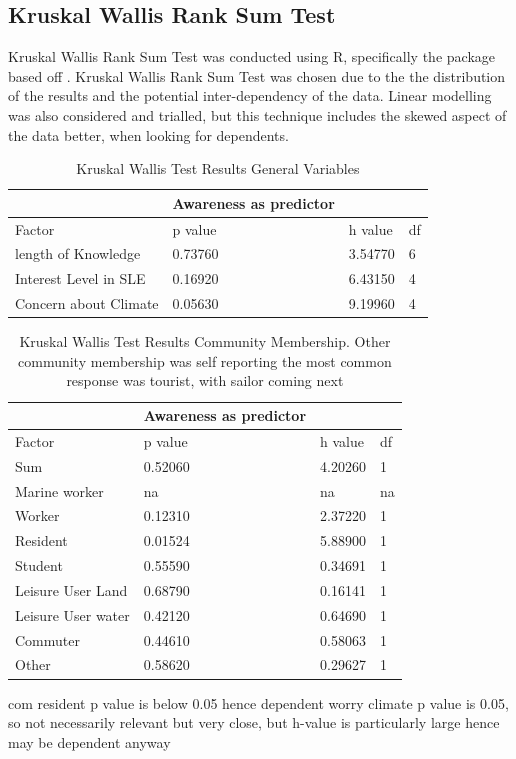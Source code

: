 \subsection{Kruskal Wallis Rank Sum Test}
Kruskal Wallis Rank Sum Test was conducted using R, specifically the package based off \cite{hollander_nonparametric_2014}. Kruskal Wallis Rank Sum Test was chosen due to the the distribution of the results and the potential inter-dependency of the data. Linear modelling was also considered and trialled, but this technique includes the skewed aspect of the data better, when looking for dependents. 
\begin{table}[h]
    \centering
    \begin{tabular}{|l|l|l|l|}
    \hline
         ~ &Awareness as predictor & ~ & ~ \\ \hline
        Factor & p value & h value & df \\ \hline
           length of Knowledge & 0.73760 & 3.54770 & 6 \\ \hline
       Interest Level in SLE & 0.16920 & 6.43150 & 4 \\ \hline
        Concern about Climate & 0.05630 & 9.19960 & 4 \\ \hline
    \end{tabular}
    \caption{Kruskal Wallis Test Results General Variables}
    \label{Kruskal_wallis_test_general}
\end{table}


\begin{table}[h]
    \centering
    \begin{tabular}{|l|l|l|l|}
    \hline
         ~ &Awareness as predictor & ~ & ~ \\ \hline
        Factor & p value & h value & df \\ \hline
        Sum & 0.52060 & 4.20260 & 1 \\ \hline
        Marine worker & na & na & na \\ \hline
        Worker & 0.12310 & 2.37220 & 1 \\ \hline
        Resident & \cellcolor[HTML]{7df9ff} 0.01524 & 5.88900 & 1 \\ \hline
        Student & 0.55590 & 0.34691 & 1 \\ \hline
        Leisure User Land & 0.68790 & 0.16141 & 1 \\ \hline
        Leisure User water & 0.42120 & 0.64690 & 1 \\ \hline
        Commuter & 0.44610 & 0.58063 & 1 \\ \hline
        Other & 0.58620 & 0.29627 & 1 \\ \hline
    \end{tabular}
    \caption{Kruskal Wallis Test Results Community Membership. Other community membership was self reporting the most common response was tourist, with sailor coming next}
    \label{Kruskal_wallis_test_general}
\end{table}
com resident p value is below 0.05 hence dependent
worry climate p value is 0.05, so not necessarily relevant but very close, but h-value is particularly large hence may be dependent anyway

